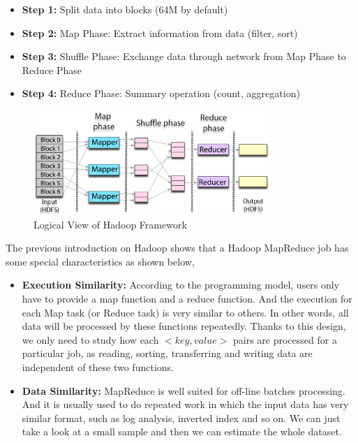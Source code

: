 \documentclass[	DIV=calc,%
							paper=a4,%
							fontsize=11pt,%
							twocolumn]{scrartcl}	 					%
\begin{document}
\begin{itemize}

\item \textbf{Step 1:} Split data into blocks (64M by default)

\item \textbf{Step 2:} Map Phase: Extract information from data (filter, sort)

\item \textbf{Step 3:} Shuffle Phase: Exchange data through network from Map Phase to Reduce Phase

\item \textbf{Step 4:} Reduce Phase: Summary operation (count, aggregation)

\end{itemize}


\begin{figure}
  \centering
    \includegraphics[width=0.8\textwidth]{images/map_reduce.pdf}
    \caption{Logical View of Hadoop Framework}
    \label{fig:MapReduce1}   
\end{figure}


The previous introduction on Hadoop shows that a Hadoop MapReduce job has some special characteristics as shown below,

\begin{itemize}
\item \textbf{Execution Similarity:} According to the programming model, users only have to provide a map function and a reduce function. And the execution for each Map task (or Reduce task) is very similar to others. In other words, all data will be processed by these functions repeatedly. Thanks to this design, we only need to study how each $<key, value>$ pairs are processed for a particular job, as reading, sorting, transferring and writing data are independent of these two functions.

\item \textbf{Data Similarity:} MapReduce is well suited for off-line batches processing. And it is usually used to do repeated work in which the input data has very similar format, such as log analysis, inverted index and so on. We can just take a look at a small sample and then we can estimate the whole dataset.
\end{itemize}
\end{document}
